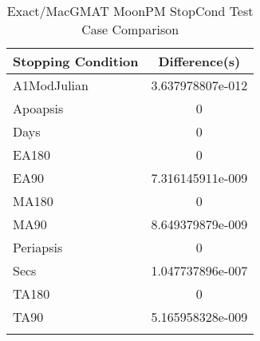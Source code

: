 \begin{table}[htbp!]
\centering
\caption{ Exact/MacGMAT MoonPM StopCond Test Case Comparison}
      \begin{tabular}{lc}
      \hline\hline
          Stopping Condition & Difference(s) \\
         \hline
         A1ModJulian & 3.637978807e-012 \\
         Apoapsis & 0 \\
         Days & 0 \\
         EA180 & 0 \\
         EA90 & 7.316145911e-009 \\
         MA180 & 0 \\
         MA90 & 8.649379879e-009 \\
         Periapsis & 0 \\
         Secs & 1.047737896e-007 \\
         TA180 & 0 \\
         TA90 & 5.165958328e-009 \\
      \hline\hline
      \label{Table: Exact-MacGMAT MoonPM StopCond Table} 
\end{tabular}
\end{table}
